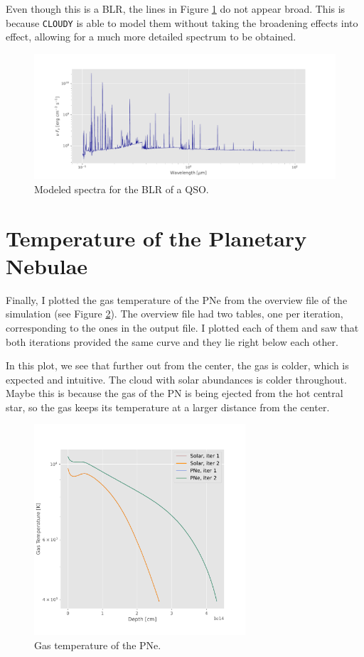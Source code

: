 \documentclass[letterpaper, oneside]{article}
\begin{document}
Even though this is a BLR, the lines in Figure \ref{fig:spectrum_qso_blr} do not appear broad. This is because \texttt{CLOUDY} is able to model them without taking the broadening effects into effect, allowing for a much more detailed spectrum to be obtained.

\begin{figure}[h]
	\centering
	\includegraphics[width=1.1\textwidth]{../spec_qso_blr.pdf}
	\caption{Modeled spectra for the BLR of a QSO.}
	\label{fig:spectrum_qso_blr}
\end{figure}



\section{Temperature of the Planetary Nebulae}

Finally, I plotted the gas temperature of the PNe from the overview file of the simulation (see Figure \ref{fig:Tgas_solar_PNe}). The overview file had two tables, one per iteration, corresponding to the ones in the output file. I plotted each of them and saw that both iterations provided the same curve and they lie right below each other.

In this plot, we see that further out from the center, the gas is colder, which is expected and intuitive. The cloud with solar abundances is colder throughout. Maybe this is because the gas of the PN is being ejected from the hot central star, so the gas keeps its temperature at a larger distance from the center.

\begin{figure}[h]
	\centering
	\includegraphics[width=0.7\textwidth]{../spec_Tgas.pdf}
	\caption{Gas temperature of the PNe.}
	\label{fig:Tgas_solar_PNe}
\end{figure}




\end{document}
